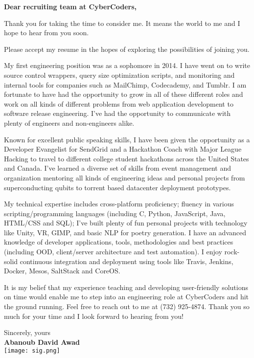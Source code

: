 \documentclass[12pt,a4paper,sans]{moderncv}
\newcommand{\COMPANY}{CyberCoders}
\newcommand\tab[1][1cm]{\hspace*{#1}}
\begin{document}
\recipient{\COMPANY{}}{ 90 Park Ave \#1702\\ New York, NY 10016} 
\date{\today}
\opening{\textbf{Dear recruiting team at \COMPANY{},}} 

\closing{Thank you for taking the time to consider me. It means the world to me and I hope to hear from you soon.}
 
\makelettertitle %

Please accept my resume in the hopes of exploring the possibilities of joining you.

\tab My first engineering position was as a sophomore in 2014. I have went on to write source control wrappers, query size optimization scripts, and monitoring and internal tools for companies such as MailChimp, Codecademy, and Tumblr. I am fortunate to have had the opportunity to grow in all of these different roles and work on all kinds of different problems from web application development to software release engineering. I’ve had the opportunity to communicate with plenty of engineers and non-engineers alike.

\tab Known for excellent public speaking skills, I have been given the opportunity as a Developer Evangelist for SendGrid and a Hackathon Coach with Major League Hacking to travel to different college student hackathons across the United States and Canada. I’ve learned a diverse set of skills from event management and organization mentoring all kinds of engineering ideas and personal projects from superconducting qubits to torrent based datacenter deployment prototypes.

\tab My technical expertise includes cross-platform proficiency; fluency in various scripting/programming languages (including C, Python, JavaScript, Java, HTML/CSS and SQL);  I’ve built plenty of fun personal projects with technology like Unity, VR, GIMP, and basic NLP for poetry generation. I have an advanced knowledge of developer applications, tools, methodologies and best practices (including OOD, client/server architecture and test automation). I enjoy rock-solid continuous integration and deployment using tools like Travis, Jenkins, Docker, Mesos, SaltStack and CoreOS.

\tab It is my belief that my experience teaching and developing user-friendly solutions on time would enable me to step into an engineering role at \COMPANY{} and hit the ground running.
Feel free to reach out to me at (732) 925-4874. Thank you so much for your time and I look forward to hearing from you!


\begin{flushright}
Sincerely, yours \\
	\textbf{Abanoub David Awad}
\\
\texttt{[image: sig.png]}
\end{flushright}


\nocite{*}

         
\end{document}
